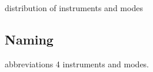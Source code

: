 \documentclass{article}
\begin{document}
distribution of instruments and modes

\subsection{Naming}

abbreviations 4 instruments and modes.



%
%
%
%
\end{document}
